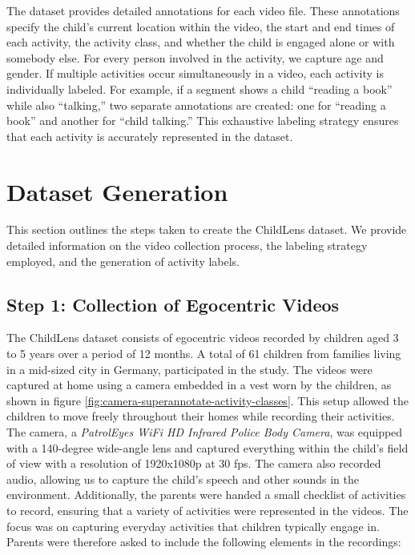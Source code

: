 \documentclass[
  man,floatsintext]{apa6}
\begin{document}
The dataset provides detailed annotations for each video file. These annotations specify the child's current location within the video, the start and end times of each activity, the activity class, and whether the child is engaged alone or with somebody else. For every person involved in the activity, we capture age and gender. If multiple activities occur simultaneously in a video, each activity is individually labeled. For example, if a segment shows a child ``reading a book'' while also ``talking,'' two separate annotations are created: one for ``reading a book'' and another for ``child talking.'' This exhaustive labeling strategy ensures that each activity is accurately represented in the dataset.

\section{Dataset Generation}\label{dataset-generation}

This section outlines the steps taken to create the ChildLens dataset. We provide detailed information on the video collection process, the labeling strategy employed, and the generation of activity labels.

\subsection{Step 1: Collection of Egocentric Videos}\label{step-1-collection-of-egocentric-videos}

The ChildLens dataset consists of egocentric videos recorded by children aged 3 to 5 years over a period of 12 months. A total of 61 children from families living in a mid-sized city in Germany, participated in the study. The videos were captured at home using a camera embedded in a vest worn by the children, as shown in figure \ref{fig:camera-superannotate-activity-classes}. This setup allowed the children to move freely throughout their homes while recording their activities. The camera, a \emph{PatrolEyes WiFi HD Infrared Police Body Camera}, was equipped with a 140-degree wide-angle lens and captured everything within the child's field of view with a resolution of 1920x1080p at 30 fps. The camera also recorded audio, allowing us to capture the child's speech and other sounds in the environment. Additionally, the parents were handed a small checklist of activities to record, ensuring that a variety of activities were represented in the videos. The focus was on capturing everyday activities that children typically engage in. Parents were therefore asked to include the following elements in the recordings:
\end{document}
